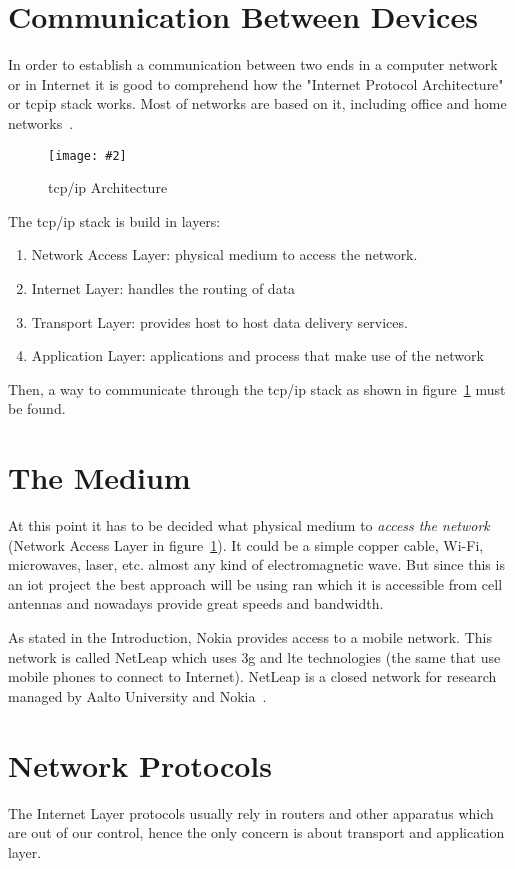 \documentclass[hidelinks,11pt,a4paper,oneside,article]{memoir}
\newcommand{\putimage}[3][10] %
{
\begin{figure}[h]
	\centering
	\captionsetup{justification=centering}
	\texttt{[image: \#2]}
	\caption{#3}
	\label{fig:#2}
\end{figure}
}
\begin{document}
\section{Communication Between Devices}
In order to establish a communication between two ends in a computer network or in Internet it is good to comprehend how the "Internet Protocol Architecture" or \gls{tcpip} stack works. Most of networks are based on it, including office and home networks~\cite[9]{tcpip}.

	\putimage[5]{tcpip}{\gls{tcp}/\gls{ip} Architecture}

The \gls{tcp}/\gls{ip} stack is build in layers:
\begin{enumerate}
	\item Network Access Layer: physical medium to access the network.
	\item Internet Layer: handles the routing of data
	\item Transport Layer: provides host to host data delivery services.
	\item Application Layer: applications and process that make use of the network
\end{enumerate}

Then, a way to communicate through the \gls{tcp}/\gls{ip} stack as shown in figure~\ref{fig:tcpip} must be found.

\section{The Medium}\label{sec:the-medium}
At this point it has to be decided what physical medium to \textit{access the network} (Network Access Layer in figure~\ref{fig:tcpip}). It could be a simple copper cable, Wi-Fi, microwaves, laser, etc. almost any kind of electromagnetic wave. But since this is an \gls{iot} project the best approach will be using \gls{ran} which it is accessible from cell antennas and nowadays provide great speeds and bandwidth.

As stated in the Introduction, Nokia provides access to a mobile network. This network is called NetLeap which uses \gls{3g} and \gls{lte} technologies (the same that use mobile phones to connect to Internet). NetLeap is a closed network for research managed by Aalto University and Nokia~\cite{netleap}.

\section{Network Protocols}
The Internet Layer protocols usually rely in routers and other apparatus which are out of our control, hence the only concern is about transport and application layer.
\end{document}

